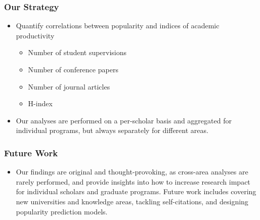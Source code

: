 \documentclass{beamer}
\begin{document}
\frame
{
	\frametitle{Our Strategy}
	\begin{itemize}
		 \item Quantify correlations between popularity and indices of academic productivity
		 	\begin{itemize}
		 		\item Number of student supervisions
		 		\item Number of conference papers
		 		\item Number of journal articles
		 		\item H-index	
		 	\end{itemize}
		 \vspace{0.3cm}
		 		
		 \item Our analyses are performed on a per-scholar basis and aggregated for individual programs, but always 			 		 separately for different areas.
		 \vspace{0.3cm}
		 
	\end{itemize}
	
}





\frame
{
	\frametitle{Future Work}
	\begin{itemize}
		\item Our findings are original and thought-provoking, as cross-area analyses are rarely performed, and provide insights  	 	 	into how to increase research impact for individual scholars and graduate programs. Future work includes covering new  	 	 	 	universities and knowledge areas, tackling self-citations, and designing popularity prediction models.	  			 		
	 	
	\end{itemize}
}
\end{document}
